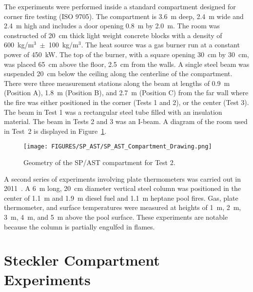 The experiments were performed inside a standard compartment designed for corner fire testing (ISO 9705). The compartment is 3.6~m deep, 2.4~m wide and 2.4~m high and includes a door opening 0.8~m by 2.0~m. The room was constructed of 20~cm thick light weight concrete blocks with a density of 600~kg/m$^3$~$\pm$~100~kg/m$^3$. The heat source was a gas burner run at a constant power of 450~kW. The top of the burner, with a square opening 30~cm by 30~cm, was placed 65~cm above the floor, 2.5~cm from the walls. A single steel beam was suspended 20~cm below the ceiling along the centerline of the compartment. There were three measurement stations along the beam at lengths of 0.9~m (Position A), 1.8~m (Position B), and 2.7~m (Position C) from the far wall where the fire was either positioned in the corner (Tests 1 and 2), or the center (Test 3). The beam in Test 1 was a rectangular steel tube filled with an insulation material. The beam in Tests 2 and 3 was an I-beam.  A diagram of the room used in Test~2 is displayed in Figure~\ref{Room_Drawing}.

\begin{figure}[ht]
\texttt{[image: FIGURES/SP\_AST/SP\_AST\_Compartment\_Drawing.png]}
\caption{Geometry of the  SP/AST compartment for Test 2.}
\label{Room_Drawing}
\end{figure}

A second series of experiments involving plate thermometers was carried out in 2011~\cite{Sjostrom:AST}. A 6~m long, 20~cm diameter vertical steel column was positioned in the center of 1.1~m and 1.9~m diesel fuel and 1.1~m heptane pool fires. Gas, plate thermometer, and surface temperatures were measured at heights of 1~m, 2~m, 3~m, 4~m, and 5~m above the pool surface. These experiments are notable because the column is partially engulfed in flames.

\section{Steckler Compartment Experiments}

